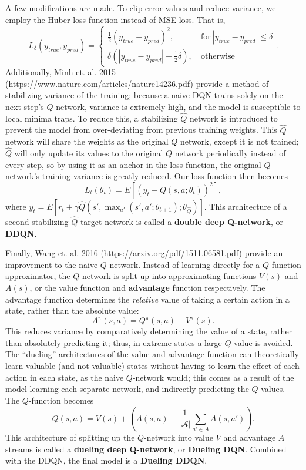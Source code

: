 \documentclass{article} %
\begin{document}
A few modifications are made. To clip error values and reduce variance, we employ the Huber loss
function instead of MSE loss. That is, \[
  L_{\delta}(y_{true}, y_{pred})=\left\{\begin{array}{rl} \frac{1}{2}(y_{true}-y_{pred})^2, &
      ~\text{for}~ \left| y_{true}-y_{pred} \right|  \le \delta \\ \delta(\left| y_{true}-y_{pred}
      \right|-\frac{1}{2}\delta ), &~\text{otherwise}~\end{array}\right.
.\] Additionally, Minh et. al. 2015 (\url{https://www.nature.com/articles/nature14236.pdf}) provide
a method of stabilizing variance of the training; because a naive DQN trains solely on the next
step's $Q$-network, variance is extremely high, and the model is susceptible to local minima traps.
To reduce this, a stabilizing $\hat{Q}$ network is introduced to prevent the model from
over-deviating from previous training weights. This $\hat{Q}$ network will share the weights as the
original $Q$ network, except it is not trained; $\hat{Q}$ will only update its values to the
original $Q$ network periodically instead of every step, so by using it as an anchor in the loss
function, the original $Q$ network's training variance is greatly reduced. Our loss function then
becomes \[
  L_t(\theta_t)=E[(y_t-Q(s,a;\theta_t))^2]
,\] where $y_t=E[r_t+\gamma \hat{Q}(s', \max_{a'}(s', a';\theta_{t+1}); \theta_{\hat{Q}})]$. This
architecture of a second stabilizing $\hat{Q}$ target network is called a \textbf{double deep
Q-network}, or \textbf{DDQN}. 

Finally, Wang et. al. 2016 (\url{https://arxiv.org/pdf/1511.06581.pdf}) provide an improvement to
the naive $Q$-network. Instead of learning directly for a $Q$-function approximator, the $Q$-network
is split up into approximating functions $V(s)$ and $A(s)$, or the value function and
\textbf{advantage} function respectively. The advantage function determines the \textit{relative}
value of taking a certain action in a state, rather than the absolute value: \[
  A^\pi(s, a)=Q^\pi(s, a)-V^\pi(s)
.\] This reduces variance by comparatively determining the value of a state, rather than absolutely
predicting it; thus, in extreme states a large $Q$ value is avoided. The ``dueling'' architectures
of the value and advantage function can theoretically learn valuable (and not valuable) states
without having to learn the effect of each action in each state, as the naive $Q$-network would;
this comes as a result of the model learning each separate network, and indirectly predicting the
$Q$-values. The $Q$-function becomes \[
  Q(s, a)=V(s)+\left( A(s,a) - \frac{1}{\left| \mathcal{A} \right| }\sum_{a'\in A}A(s,a') \right) 
.\] This architecture of splitting up the $Q$-network into value $V$ and advantage $A$ streams is
called a \textbf{dueling deep Q-network}, or \textbf{Dueling DQN}. Combined with the DDQN, the final
model is a \textbf{Dueling DDQN}.
\end{document}
